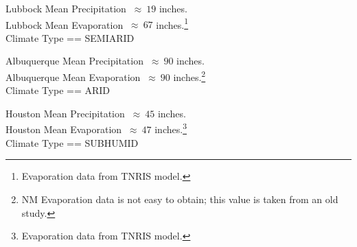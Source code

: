 \documentclass[12pt]{article}
\begin{document}
Lubbock Mean Precipitation $~\approx~19$ inches. \\
Lubbock Mean Evaporation $~\approx~67$ inches.\footnote{Evaporation data from TNRIS model.}\\
Climate Type == SEMIARID

Albuquerque Mean Precipitation $~\approx~90$ inches. \\
Albuquerque Mean Evaporation $~\approx~90$ inches.\footnote{NM Evaporation data is not easy to obtain; this value is taken from an old study.}\\
Climate Type == ARID

Houston Mean Precipitation $~\approx~45$ inches. \\
Houston Mean Evaporation $~\approx~47$ inches.\footnote{Evaporation data from TNRIS model.}\\
Climate Type == SUBHUMID
\end{document}
